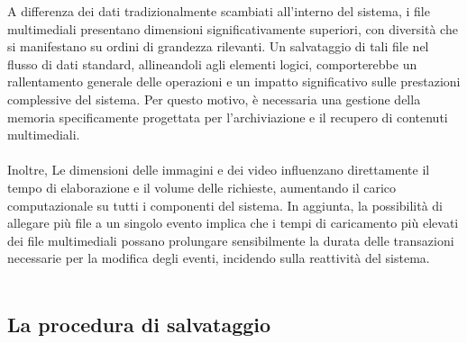 A differenza dei dati tradizionalmente scambiati all’interno del sistema, i file multimediali presentano dimensioni significativamente superiori, 
con diversità che si manifestano su ordini di grandezza rilevanti. 
Un salvataggio di tali file nel flusso di dati standard, allineandoli agli elementi logici, 
comporterebbe un rallentamento generale delle operazioni e un impatto significativo sulle prestazioni complessive del sistema. 
Per questo motivo, è necessaria una gestione della memoria specificamente progettata per l’archiviazione e il recupero di contenuti multimediali.	\\
\\
Inoltre, Le dimensioni delle immagini e dei video influenzano direttamente il tempo di elaborazione e il volume delle richieste, 
aumentando il carico computazionale su tutti i componenti del sistema. 
In aggiunta, la possibilità di allegare più file a un singolo evento implica che i tempi di caricamento più elevati dei file multimediali 
possano prolungare sensibilmente la durata delle transazioni necessarie per la modifica degli eventi, incidendo sulla reattività del sistema.\\
\\
\clearpage
\subsection{La procedura di salvataggio}

